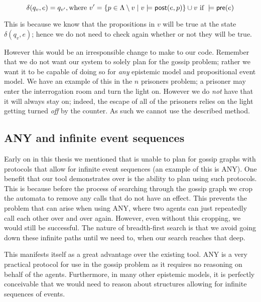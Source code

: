 \documentclass[10pt, a4paper]{report}
\begin{document}
\begin{equation} \label{eq:delta2}
  \delta(q_v, e) = q_{v'}, \text{where } v' = \{p \in \Lambda \setminus v \mid v \models \textsf{post}(e, p)\} \cup v
  \text{ if } 
  \models \textsf{pre}(e)
\end{equation}

This is because we know that the propositions in $v$ will be true at the state
$\delta(q_v, e)$; hence we do not need to check again whether or not they will
be true. 

However this would be an irresponsible change to make to our code. Remember that
we do not want our system to solely plan for the gossip problem; rather we want
it to be capable of doing so for \emph{any} epistemic model and propositional
event model. We have an example of this in the $n$ prisoners problem; a prisoner
may enter the interrogation room and turn the light on. However we do \emph{not}
have that it will always stay on; indeed, the escape of all of the prisoners
relies on the light getting turned \emph{off} by the counter. As such we cannot
use the described method. 

\subsection{\textsf{ANY} and infinite event sequences}

Early on in this thesis we mentioned that \cite{GithubGossip} is unable to plan
for gossip graphs with protocols that allow for infinite event sequences (an
example of this is \textsf{ANY}). One benefit that our tool demonstrates over
\cite{GithubGossip} is the ability to plan using such protocols. This is because
before the process of searching through the gossip graph we crop the automata to
remove any calls that do not have an effect. This prevents the problem that can
arise when using \textsf{ANY}, where two agents can just repeatedly call each
other over and over again. However, even without this cropping, we would still
be successful. The nature of breadth-first search is that we avoid going down
these infinite paths until we need to, when our search reaches that deep. 

This manifests itself as a great advantage over the existing tool. \textsf{ANY}
is a very practical protocol for use in the gossip problem as it requires no
reasoning on behalf of the agents. Furthermore, in many other epistemic models,
it is perfectly conceivable that we would need to reason about structures
allowing for infinite sequences of events. 
\end{document}
